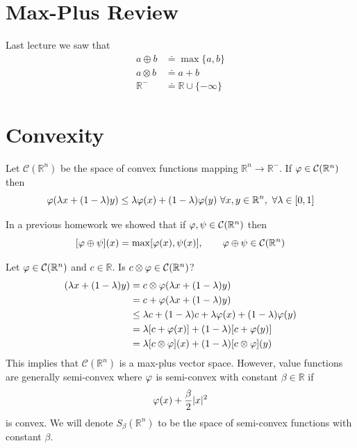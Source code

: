 
\mainmatter
\setcounter{page}{1}

\lectureseries[\course]{\course}

\date{December 3, 2009}

\setaddress

\setcounter{lecture}{17}
\setcounter{chapter}{17}


\section{Max-Plus Review}
Last lecture we saw that
\begin{align*}
a\oplus b &\doteq \max\{a,b\} \\
a\otimes b &\doteq a+b \\
\mathbb{R}^- &\doteq \mathbb{R}\cup\{-\infty\}
\end{align*}

\section{Convexity}
Let $\mathcal{C}(\mathbb{R}^n)$ be the space of convex functions mapping $\mathbb{R}^n\to\mathbb{R}^-$. If $\varphi\in\mathcal{C}(\mathbb{R}^n)$ then
$$\varphi(\lambda x+(1-\lambda)y) \leq \lambda\varphi(x) + (1-\lambda)\varphi(y) ~\forall x,y\in\mathbb{R}^n, ~\forall \lambda\in[0,1]$$

In a previous homework we showed that if $\varphi,\psi\in\mathcal{C}(\mathbb{R}^n)$ then
$$[\varphi\oplus\psi](x) = \max[\varphi(x),\psi(x)], \qquad \varphi\oplus\psi\in\mathcal{C}(\mathbb{R}^n)$$

Let $\varphi\in\mathcal{C}(\mathbb{R}^n)$ and $c\in\mathbb{R}$. Is $c\otimes\varphi\in\mathcal{C}(\mathbb{R}^n)$?
\begin{align*}
[c\otimes\vp](\lambda x+(1-\lambda)y) &= c\otimes\vp(\lambda x+(1-\lambda)y) \\
&= c + \vp(\lambda x+(1-\lambda)y) \\
&\leq \lambda c + (1-\lambda)c + \lambda\vp(x) + (1-\lambda)\vp(y) \\
&= \lambda[c+\vp(x)] + (1-\lambda)[c+\vp(y)] \\
&= \lambda[c\otimes\vp](x) + (1-\lambda)[c\otimes\vp](y)
\end{align*}
This implies that $\mathcal{C}(\mathbb{R}^n)$ is a max-plus vector space. However, value functions are generally semi-convex where $\varphi$ is semi-convex with constant $\beta\in\mathbb{R}$ if
$$\varphi(x) + \frac{\beta}{2}|x|^2$$
is convex. We will denote $S_\beta(\mathbb{R}^n)$ to be the space of semi-convex functions with constant $\beta$.

